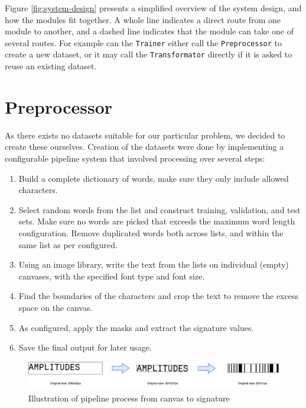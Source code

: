 Figure \ref{fig:system-design} presents a simplified overview of the system design, and how the modules fit together. A whole line indicates a direct route from one module to another, and a dashed line indicates that the module can take one of several routes. For example can the {\tt Trainer} either call the {\tt Preprocessor} to create a new dataset, or it may call the {\tt Transformator} directly if it is asked to reuse an existing dataset.


\section{Preprocessor}
\label{sec:preprocessor}
As there exists no datasets suitable for our particular problem, we decided to create these ourselves. Creation of the datasets were done by implementing a configurable pipeline system that involved processing over several steps:

\begin{enumerate}
    \item Build a complete dictionary of words, make sure they only include allowed characters.
    \item Select random words from the list and construct training, validation, and test sets. Make sure no words are picked that exceeds the maximum word length configuration. Remove duplicated words both across lists, and within the same list as per configured.
    \item Using an image library, write the text from the lists on individual (empty) canvases, with the specified font type and font size.
    \item Find the boundaries of the characters and crop the text to remove the excess space on the canvas.
    \item As configured, apply the masks and extract the signature values.
    \item Save the final output for later usage.
\end{enumerate}

\begin{figure}[H]
    \centering
    \includegraphics[width=1\textwidth]{fig/development_process/pipeline.png}
    \caption{Illustration of pipeline process from canvas to signature}
    \label{fig:development-pipeline}
\end{figure}

